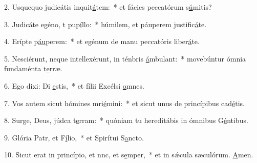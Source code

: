 2. Usquequo judicátis inquit\uline{á}tem:~* et fácies peccatórum s\uline{ú}mitis?\par 
3. Judicáte egéno, t pup\uline{í}llo:~* húmilem, et páuperem justific\uline{á}te.\par 
4. Erípte p\uline{áu}perem:~* et egénum de manu peccatóris liber\uline{á}te.\par 
5. Nesciérunt, neque intellexérunt, in ténbris \uline{á}mbulant:~* movebúntur ómnia fundaménta t\uline{e}rræ.\par 
6. Ego dixi: Di \uline{e}stis,~* et fílii Excélsi \uline{o}mnes.\par 
7. Vos autem sicut hómines mri\uline{é}mini:~* et sicut unus de princípibus cad\uline{é}tis.\par 
8. Surge, Deus, júdca t\uline{e}rram:~* quóniam tu hereditábis in ómnibus G\uline{é}ntibus.\par 
9. Glória Patr, et F\uline{í}lio,~* et Spirítui S\uline{a}ncto.\par 
10. Sicut erat in princípio, et nnc, et s\uline{e}mper,~* et in sǽcula sæculórum. \uline{A}men.\par 
